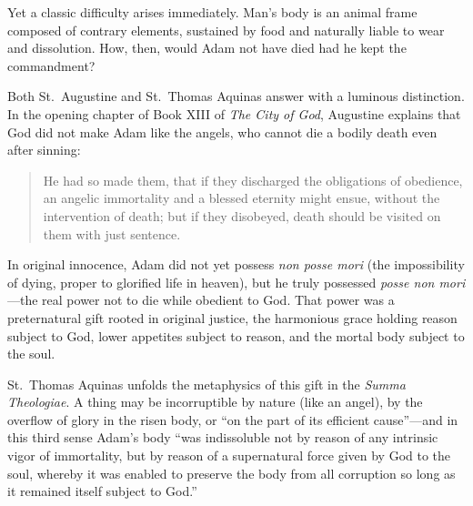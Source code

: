 Yet a classic difficulty arises immediately. Man's body is an animal frame composed of contrary elements, sustained by food and naturally liable to wear and dissolution. How, then, would Adam not have died had he kept the commandment?

Both St.~Augustine and St.~Thomas Aquinas answer with a luminous distinction. In the opening chapter of Book XIII of \emph{The City of God}, Augustine explains that God did not make Adam like the angels, who cannot die a bodily death even after sinning:

\begin{quote}
He had so made them, that if they discharged the obligations of obedience, an angelic immortality and a blessed eternity might ensue, without the intervention of death; but if they disobeyed, death should be visited on them with just sentence.
\end{quote}

In original innocence, Adam did not yet possess \emph{non posse mori} (the impossibility of dying, proper to glorified life in heaven), but he truly possessed \emph{posse non mori}---the real power not to die while obedient to God. That power was a preternatural gift rooted in original justice, the harmonious grace holding reason subject to God, lower appetites subject to reason, and the mortal body subject to the soul.

St.~Thomas Aquinas unfolds the metaphysics of this gift in the \emph{Summa Theologiae}. A thing may be incorruptible by nature (like an angel), by the overflow of glory in the risen body, or ``on the part of its efficient cause''---and in this third sense Adam's body ``was indissoluble not by reason of any intrinsic vigor of immortality, but by reason of a supernatural force given by God to the soul, whereby it was enabled to preserve the body from all corruption so long as it remained itself subject to God.''

